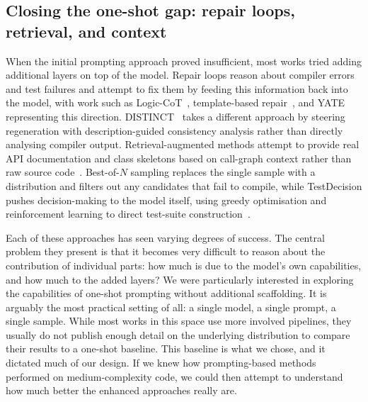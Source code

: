 \subsection{Closing the one-shot gap: repair loops, retrieval, and context}\label{sec:rel-fixes}
When the initial prompting approach proved insufficient, most works tried adding
additional layers on top of the model. Repair loops reason about compiler errors and test
failures and attempt to fix them by feeding this information back into the model, with
work such as Logic-CoT~\cite{zeng2026logic}, template-based repair~\cite{gu2025template},
and YATE~\cite{konstantinou2025yate} representing this direction.
DISTINCT~\cite{xue2025distinct} takes a different approach by steering regeneration with
description-guided consistency analysis rather than directly analysing compiler output.
Retrieval-augmented methods attempt to provide real API documentation and class skeletons
based on call-graph context rather than raw source code~\cite{liu2025typeaware}. Best-of-$N$
sampling replaces the single sample with a distribution and filters out any candidates
that fail to compile, while TestDecision pushes decision-making to the model itself, using
greedy optimisation and reinforcement learning to direct test-suite
construction~\cite{wang2026testdecision}.

Each of these approaches has seen varying degrees of success. The central problem they
present is that it becomes very difficult to reason about the contribution of individual
parts: how much is due to the model's own capabilities, and how much to the added layers?
We were particularly interested in exploring the capabilities of one-shot prompting
without additional scaffolding. It is arguably the most practical setting of all: a single
model, a single prompt, a single sample. While most works in this space use more involved
pipelines, they usually do not publish enough detail on the underlying distribution to
compare their results to a one-shot baseline. This baseline is what we chose, and it
dictated much of our design. If we knew how prompting-based methods performed on
medium-complexity code, we could then attempt to understand how much better the enhanced
approaches really are.

